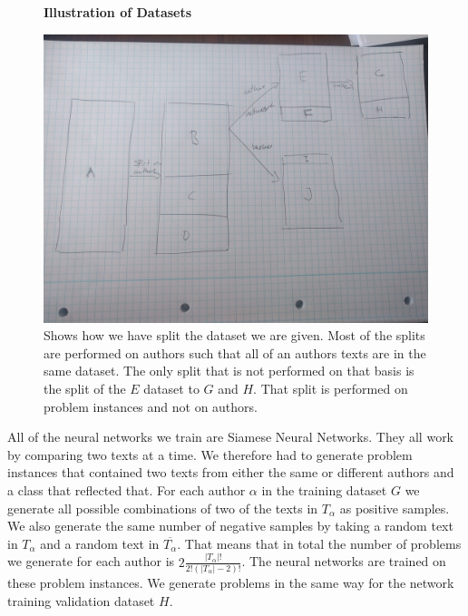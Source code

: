 \begin{figure}
    \centering
    \textbf{Illustration of Datasets}\par\medskip
    \includegraphics[width=\textwidth]{./pictures/data/data_split.jpg}
    \caption{Shows how we have split the dataset we are given. Most of the
        splits are performed on authors such that all of an authors texts are
        in the same dataset. The only split that is not performed on that basis
        is the split of the $E$ dataset to $G$ and $H$. That split is performed
        on problem instances and not on authors.}
    \label{fig:data_split}
\end{figure}

All of the neural networks we train are Siamese Neural Networks. They all
work by comparing two texts at a time. We therefore had to generate problem
instances that contained two texts from either the same or different authors and
a class that reflected that. For each author $\alpha$ in the training dataset
$G$ we generate all possible combinations of two of the texts in $T_\alpha$
as positive samples. We also generate the same number of negative samples by
taking a random text in $T_\alpha$ and a random text in $\overline{T_\alpha}$.
That means that in total the number of problems we generate for each author is
$2\frac{\left|T_\alpha\right|!}{2!(\left|T_\alpha\right|-2)!}$. The neural
networks are trained on these problem instances. We generate problems in the
same way for the network training validation dataset $H$.
